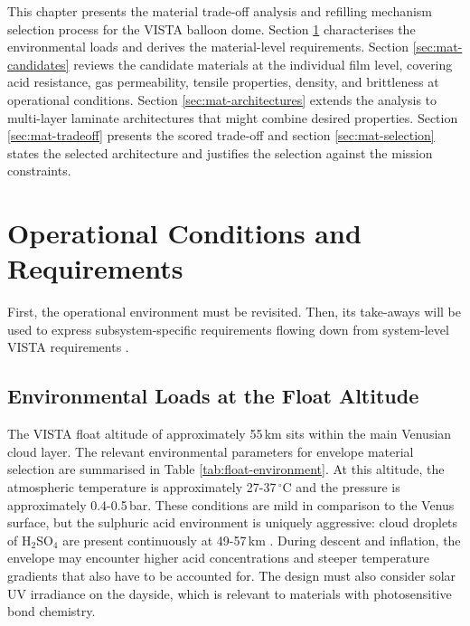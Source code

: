\noindent This chapter presents the material trade-off analysis and refilling mechanism selection process for the VISTA balloon dome. Section \ref{sec:operational-and-req} characterises the environmental loads and derives the material-level requirements. Section \ref{sec:mat-candidates} reviews the candidate materials at the individual film level, covering acid resistance, gas permeability, tensile properties, density, and brittleness at operational conditions. Section \ref{sec:mat-architectures} extends the analysis to multi-layer laminate architectures that might combine desired properties. Section \ref{sec:mat-tradeoff} presents the scored trade-off and section \ref{sec:mat-selection} states the selected architecture and justifies the selection against the mission constraints.

\section{Operational Conditions and Requirements}\label{sec:operational-and-req}

First, the operational environment must be revisited. Then, its take-aways will be used to express subsystem-specific requirements flowing down from system-level VISTA requirements \cite{baseline_vista}.

\subsection{Environmental Loads at the Float Altitude}
\label{sec:mat-environment}

The VISTA float altitude of approximately 55\,km sits within the main Venusian cloud layer. The relevant environmental parameters for envelope material selection are summarised in Table \ref{tab:float-environment}. At this altitude, the atmospheric temperature is approximately 27-37\,$^\circ$C and the pressure is approximately 0.4-0.5\,bar. These conditions are mild in comparison to the Venus surface, but the sulphuric acid environment is uniquely aggressive: cloud droplets of H$_2$SO$_4$ are present continuously at 49-57\,km \cite{Knollenberg1980_VenusAerosol}. During descent and inflation, the envelope may encounter higher acid concentrations and steeper temperature gradients that also have to be accounted for. The design must also consider solar UV irradiance on the dayside, which is relevant to materials with photosensitive bond chemistry.

